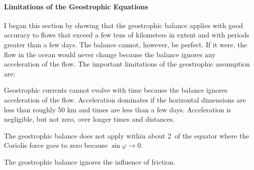 \paragraph{Limitations of the Geostrophic Equations}
I began this section by showing that the geostrophic balance applies with good
accuracy to flows that exceed a few tens of kilometers
in extent and with periods greater than a few days. The balance cannot, however, be perfect.
If it were, the flow in the ocean would never change because the balance ignores any
acceleration of the flow. The important limitations of the geostrophic
assumption are:

\begin{enumerate}
\vitem Geostrophic currents cannot evolve with time because the
balance ignores acceleration of the flow. Acceleration dominates if the  horizontal dimensions are less than
roughly 50 km and times are less than a few days. Acceleration is negligible, but not zero, over longer
times and distances.

\vitem The geostrophic balance does not apply within about
2\degrees\ of the equator where the Coriolis force goes to zero because $\sin \varphi \rightarrow 0$.

\vitem The geostrophic balance ignores the
influence of friction.
\end{enumerate}

